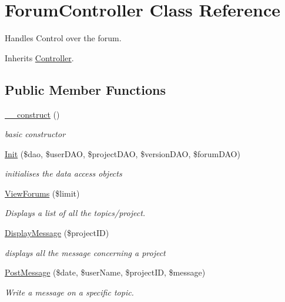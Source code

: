 \hypertarget{class_forum_controller}{}\section{Forum\+Controller Class Reference}
\label{class_forum_controller}


Handles Control over the forum.  




Inherits \hyperlink{class_controller}{Controller}.

\subsection*{Public Member Functions}
\begin{DoxyCompactItemize}
\item 
\hyperlink{class_forum_controller_a095c5d389db211932136b53f25f39685}{\+\_\+\+\_\+construct} ()
\begin{DoxyCompactList}\small\item\em basic constructor \end{DoxyCompactList}\item 
\hyperlink{class_forum_controller_a4b9462f290a447541323a8a21484c193}{Init} (\$dao, \$user\+D\+AO, \$project\+D\+AO, \$version\+D\+AO, \$forum\+D\+AO)
\begin{DoxyCompactList}\small\item\em initialises the data access objects \end{DoxyCompactList}\item 
\hyperlink{class_forum_controller_ac91f2abbd0e5638d85281ba298f69b8d}{View\+Forums} (\$limit)
\begin{DoxyCompactList}\small\item\em Displays a list of all the topics/project. \end{DoxyCompactList}\item 
\hyperlink{class_forum_controller_ae680809f7a8b645666ee0f185315e632}{Display\+Message} (\$project\+ID)
\begin{DoxyCompactList}\small\item\em displays all the message concerning a project \end{DoxyCompactList}\item 
\hyperlink{class_forum_controller_a6aa6340089c9cbf1d660ede98e40a89f}{Post\+Message} (\$date, \$user\+Name, \$project\+ID, \$message)
\begin{DoxyCompactList}\small\item\em Write a message on a specific topic. \end{DoxyCompactList}\end{DoxyCompactItemize}
